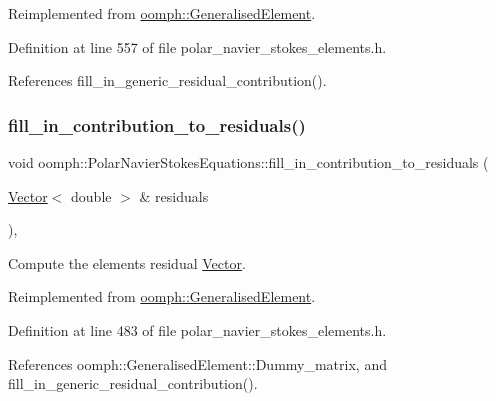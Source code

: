 Reimplemented from \hyperlink{classoomph_1_1GeneralisedElement_a2b6294a730647cf865da94f2531466f8}{oomph\+::\+Generalised\+Element}.



Definition at line 557 of file polar\+\_\+navier\+\_\+stokes\+\_\+elements.\+h.



References fill\+\_\+in\+\_\+generic\+\_\+residual\+\_\+contribution().

\mbox{\label{classoomph_1_1PolarNavierStokesEquations_a0f859172293fdaa604e280084e503b68}} 
\subsubsection{\texorpdfstring{fill\+\_\+in\+\_\+contribution\+\_\+to\+\_\+residuals()}{fill\_in\_contribution\_to\_residuals()}}
{\footnotesize\ttfamily void oomph\+::\+Polar\+Navier\+Stokes\+Equations\+::fill\+\_\+in\+\_\+contribution\+\_\+to\+\_\+residuals (\begin{DoxyParamCaption}\item[{\hyperlink{classoomph_1_1Vector}{Vector}$<$ double $>$ \&}]{residuals }\end{DoxyParamCaption})\hspace{0.3cm}{\ttfamily [inline]}, {\ttfamily [virtual]}}



Compute the element\textquotesingle{}s residual \hyperlink{classoomph_1_1Vector}{Vector}. 



Reimplemented from \hyperlink{classoomph_1_1GeneralisedElement_a310c97f515e8504a48179c0e72c550d7}{oomph\+::\+Generalised\+Element}.



Definition at line 483 of file polar\+\_\+navier\+\_\+stokes\+\_\+elements.\+h.



References oomph\+::\+Generalised\+Element\+::\+Dummy\+\_\+matrix, and fill\+\_\+in\+\_\+generic\+\_\+residual\+\_\+contribution().


